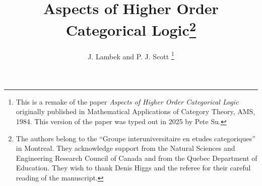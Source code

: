 \newcommand{\iso}{\cong}                %
\newcommand{\eqv}{\simeq}               %
\newcommand{\sub}{\subseteq}            %

\usepackage{amsmath,amsthm}

\theoremstyle{definition}

\newtheorem{thm}{Theorem}[section]
\newtheorem{lemma}[thm]{Lemma}
\newtheorem{prop}[thm]{Proposition}
\newtheorem{cor}[thm]{Corollary}
\newtheorem{defn}[thm]{Definition}
\newtheorem{example}[thm]{Example}
\newtheorem{remark}[thm]{Remark}
\newtheorem{note}[thm]{Note}

\makeatletter
\DeclareRobustCommand{\eqx}{\mathrel{\mathpalette\eq@{X}}}
\DeclareRobustCommand{\eqlx}{\mathrel{\mathpalette\eq@{x}}}
\DeclareRobustCommand{\eqy}{\mathrel{\mathpalette\eq@{Y}}}
\DeclareRobustCommand{\eqxx}{\mathrel{\mathpalette\eq@{X \union \{x\}}}}
\DeclareRobustCommand{\eqtx}{\mathrel{\mathpalette\eq@{\trans(X)}}}
\newcommand{\eq@}[2]{%
  \vtop{\offinterlineskip
    \ialign{\hfil##\hfil\cr
      $\m@th#1=$\cr %
      \noalign{\sbox\z@{$\m@th#1\mkern0mu$}\kern-\wd\z@}
      $\m@th\alexey@demote{#1}#2$\cr
    }%
  }%
}
\DeclareRobustCommand{\eqdX}{\mathrel{\mathpalette\eqd@{X}}}
\DeclareRobustCommand{\eqdx}{\mathrel{\mathpalette\eqd@{x}}}
\newcommand{\eqd@}[2]{%
  \vtop{\offinterlineskip
    \ialign{\hfil##\hfil\cr
      $\m@th#1\deqd$\cr %
      \noalign{\sbox\z@{$\m@th#1\mkern0mu$}\kern-\wd\z@}
      $\m@th\alexey@demote{#1}#2$\cr
    }%
  }%
}
\newcommand{\alexey@demote}[1]{%
  \ifx#1\displaystyle\scriptstyle\else
  \ifx#1\textstyle\scriptstyle\else
  \scriptscriptstyle\fi\fi
}

\makeatother

\usepackage{footmisc}

\makeatletter
\let\original@footnotemark\footnotemark
\newcommand{\align@footnotemark}{%
  \ifmeasuring@
    \chardef\@tempfn=\value{footnote}%
    \original@footnotemark
    \setcounter{footnote}{\@tempfn}%
  \else
    \iffirstchoice@
      \original@footnotemark
    \fi
  \fi}
\pretocmd{\start@align}{\let\footnotemark\align@footnotemark}{}{}
\makeatother

\makeatletter
\newcommand*\dotop{\mathpalette\bigcdot@{.6}}
\newcommand*\bigcdot@[2]{\mathbin{\vcenter{\hbox{\scalebox{#2}{$\m@th#1\bullet$}}}}}
\makeatother

\title{\large Aspects of Higher Order Categorical Logic\footnote{The authors belong to the ``Groupe interuniversitaire en etudes categoriques'' in Montreal. They acknowledge support from the Natural Sciences and
Engineering Research Council of Canada and from the Quebec Department of
Education. They wish to thank Denis Higgs and the referee for their careful
reading of the manuscript.}}
\author{\normalsize J. Lambek and P. J. Scott%
\footnote{This is a remake of the paper {\em Aspects of Higher Order Categorical Logic}
originally published in Mathematical Applications of Category Theory, AMS, 1984. This
version of the paper was typed out in 2025 by Pete Su.} 
}

